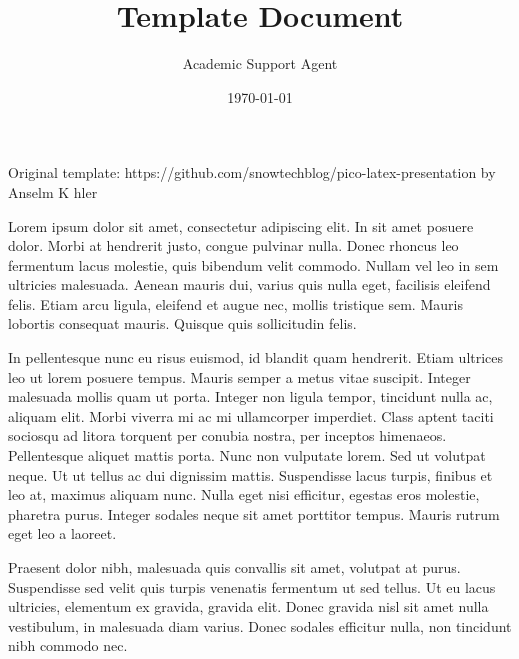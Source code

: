 \documentclass{article}
\title{Template Document}
\author{Academic Support Agent}
\date{\today}
\begin{document}
\maketitle

\begin{frame}\label{\secvariable}



\parbox{\linewidth}{

Original template: https://github.com/snowtechblog/pico-latex-presentation by Anselm K hler


\vspace{12pt}

Lorem ipsum dolor sit amet, consectetur adipiscing elit. In sit amet posuere dolor. Morbi at hendrerit justo, congue pulvinar nulla. Donec rhoncus leo fermentum lacus molestie, quis bibendum velit commodo. Nullam vel leo in sem ultricies malesuada. Aenean mauris dui, varius quis nulla eget, facilisis eleifend felis. Etiam arcu ligula, eleifend et augue nec, mollis tristique sem. Mauris lobortis consequat mauris. Quisque quis sollicitudin felis.

 \vspace{12pt}
 
In pellentesque nunc eu risus euismod, id blandit quam hendrerit. Etiam ultrices leo ut lorem posuere tempus. Mauris semper a metus vitae suscipit. Integer malesuada mollis quam ut porta. Integer non ligula tempor, tincidunt nulla ac, aliquam elit. Morbi viverra mi ac mi ullamcorper imperdiet. Class aptent taciti sociosqu ad litora torquent per conubia nostra, per inceptos himenaeos. Pellentesque aliquet mattis porta. Nunc non vulputate lorem. Sed ut volutpat neque. Ut ut tellus ac dui dignissim mattis. Suspendisse lacus turpis, finibus et leo at, maximus aliquam nunc. Nulla eget nisi efficitur, egestas eros molestie, pharetra purus. Integer sodales neque sit amet porttitor tempus. Mauris rutrum eget leo a laoreet.

 \vspace{12pt}
 
Praesent dolor nibh, malesuada quis convallis sit amet, volutpat at purus. Suspendisse sed velit quis turpis venenatis fermentum ut sed tellus. Ut eu lacus ultricies, elementum ex gravida, gravida elit. Donec gravida nisl sit amet nulla vestibulum, in malesuada diam varius. Donec sodales efficitur nulla, non tincidunt nibh commodo nec. 
}


   
\end{frame}
\end{document}
